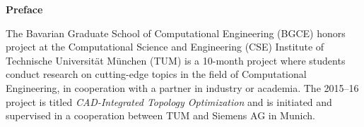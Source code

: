 \clearemptydoublepage
{}
{}	


\vspace*{3cm}

\begin{flushleft}
{\Large \bf Preface}
\end{flushleft}

\vspace{1cm}
The Bavarian Graduate School of Computational Engineering (BGCE) honors project at the Computational Science and Engineering (CSE) Institute of Technische Universit{\"a}t M{\"u}nchen (TUM) is a 10-month project where students conduct research on cutting-edge topics in the field of Computational Engineering, in cooperation with a partner in industry or academia. The 2015--16 project is titled \emph{CAD-Integrated Topology Optimization} and is initiated and supervised in a cooperation between TUM and Siemens AG in Munich.


\newpage
